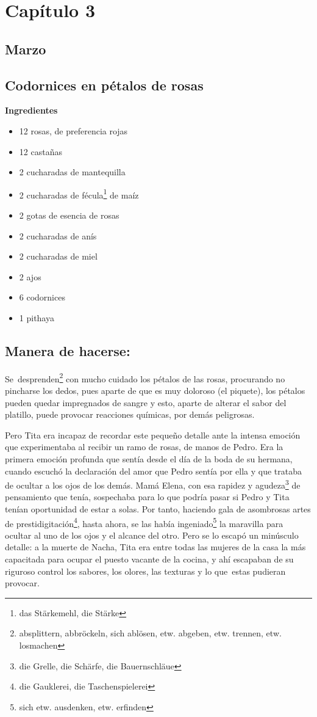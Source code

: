 \clearpage

\section*{ Capítulo 3 }
\subsection*{ Marzo }
\subsection*{ Codornices en pétalos de rosas }
\textbf{Ingredientes}
\begin{itemize}
    \item 12 rosas, de preferencia rojas
    \item 12 castañas
    \item 2 cucharadas de mantequilla
    \item 2 cucharadas de fécula\footnote{das Stärkemehl, die Stärke} de maíz
    \item 2 gotas de esencia de rosas
    \item 2 cucharadas de anís
    \item 2 cucharadas de miel
    \item 2 ajos
    \item 6 codornices
    \item 1 pithaya
\end{itemize}

\subsection*{ Manera de hacerse: }
Se~desprenden\footnote{absplittern, abbröckeln, sich ablösen, etw. abgeben, etw. trennen, etw. losmachen}
con mucho cuidado los pétalos de las rosas,
procurando no pincharse los dedos, pues aparte de que es muy doloroso
(el piquete), los pétalos pueden quedar impregnados de sangre y esto,
aparte de alterar el sabor del platillo, puede provocar reacciones
químicas, por demás peligrosas.

Pero Tita era incapaz de recordar este pequeño detalle ante la intensa
emoción que experimentaba al recibir un ramo de rosas, de manos de
Pedro. Era la primera emoción profunda que sentía desde el día de la
boda de su hermana, cuando escuchó la declaración del amor que Pedro
sentía por ella y que trataba de ocultar a los ojos de los demás. Mamá
Elena, con esa rapidez y agudeza\footnote{die Grelle, die Schärfe, die Bauernschläue}
de pensamiento que tenía, sospechaba para lo que podría pasar si Pedro
y Tita tenían oportunidad de estar a solas. Por tanto, haciendo gala de
asombrosas artes de prestidigitación\footnote{die Gauklerei, die Taschenspielerei},
hasta ahora, se las había ingeniado\footnote{sich etw. ausdenken, etw. erfinden}
la maravilla para ocultar al uno de los ojos y el alcance del otro.
Pero se lo escapó un minúsculo detalle: a la muerte de Nacha, Tita era
entre todas las mujeres de la casa la más capacitada para ocupar el
puesto vacante de la cocina, y ahí escapaban de su riguroso control
los sabores, los olores, las texturas y lo que~estas pudieran
provocar.

